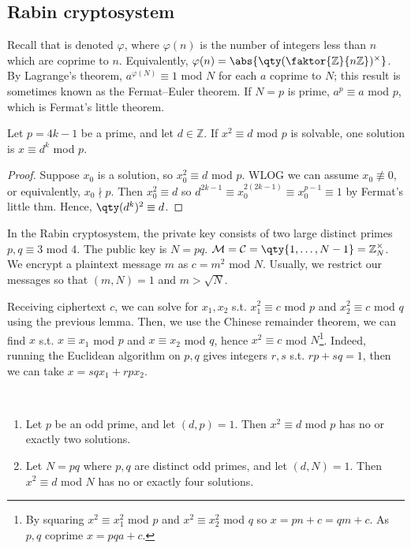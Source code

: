 \subsection{Rabin cryptosystem}
Recall that  is denoted $\varphi$, where $\varphi(n)$ is the number of integers less than $n$ which are coprime to $n$.
Equivalently, $\varphi(n) = \abs{\qty(\faktor{\mathbb Z}{n\mathbb Z})^\times}$.
By Lagrange's theorem, $a^{\varphi(N)} \equiv 1$ mod $N$ for each $a$ coprime to $N$; this result is sometimes known as the Fermat--Euler theorem.
If $N = p$ is prime, $a^p \equiv a$ mod $p$, which is Fermat's little theorem.

\begin{lemma}
    Let $p = 4k - 1$ be a prime, and let $d \in \mathbb Z$.
    If $x^2 \equiv d$ mod $p$ is solvable, one solution is $x \equiv d^k$ mod $p$.
\end{lemma}

\begin{proof}
    Suppose $x_0$ is a solution, so $x_0^2 \equiv d$ mod $p$.
    WLOG we can assume $x_0 \not\equiv 0$, or equivalently, $x_0 \nmid p$.
    Then $x_0^2 \equiv d$ so $d^{2k-1} \equiv x_0^{2(2k-1)} \equiv x_0^{p-1} \equiv 1$ by Fermat's little thm.
    Hence, $\qty(d^k)^2 \equiv d$.
\end{proof}

In the Rabin cryptosystem, the private key consists of two large distinct primes $p, q \equiv 3$ mod 4.
The public key is $N = pq$.
$\mathcal M = \mathcal C = \qty{1, \dots, N-1} = \mathbb Z_N^\times$.
We encrypt a plaintext message $m$ as $c = m^2$ mod $N$.
Usually, we restrict our messages so that $(m, N) = 1$ and $m > \sqrt{N}$.

Receiving ciphertext $c$, we can solve for $x_1, x_2$ s.t. $x_1^2 \equiv c$ mod $p$ and $x_2^2 \equiv c$ mod $q$ using the previous lemma.
Then, we use the Chinese remainder theorem, we can find $x$ s.t. $x \equiv x_1$ mod $p$ and $x \equiv x_2$ mod $q$, hence $x^2 \equiv c$ mod $N$\footnote{By squaring $x^2 \equiv x_1^2$ mod $p$ and $x^2 \equiv x_2^2$ mod $q$ so $x = pn + c = qm + c$. As $p, q$ coprime $x = pqa + c$.}.
Indeed, running the Euclidean algorithm on $p, q$ gives integers $r, s$ s.t. $rp + sq = 1$, then we can take $x = sqx_1 + rpx_2$.

\begin{lemma} ~\vspace*{-1.5\baselineskip}
    \begin{enumerate}
        \item Let $p$ be an odd prime, and let $(d, p) = 1$.
        Then $x^2 \equiv d$ mod $p$ has no or exactly two solutions.
        \item Let $N = pq$ where $p, q$ are distinct odd primes, and let $(d, N) = 1$.
        Then $x^2 \equiv d$ mod $N$ has no or exactly four solutions.
    \end{enumerate}
\end{lemma}


